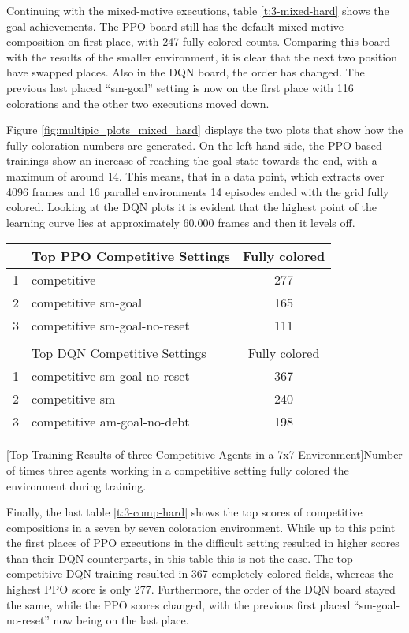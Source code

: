 Continuing with the mixed-motive executions, table \ref{t:3-mixed-hard} shows the goal achievements.
The PPO board still has the default mixed-motive composition on first place, with 247 fully colored counts. Comparing this board with the results of the smaller environment, it is clear that the next two position have swapped places. Also in the DQN board, the order has changed. The previous last placed ``sm-goal'' setting is now on the first place with 116 colorations and the other two executions moved down. 

Figure \ref{fig:multipic_plots_mixed_hard} displays the two plots that show how the fully coloration numbers are generated. On the left-hand side, the PPO based trainings show an increase of reaching the goal state towards the end, with a maximum of around 14. This means, that in a data point, which extracts over 4096 frames and 16 parallel environments 14 episodes ended with the grid fully colored. Looking at the DQN plots it is evident that the highest point of the learning curve lies at approximately 60.000 frames and then it levels off.

\begin{center}
\begin{tabular}{clc}\hline
      & Top PPO Competitive Settings & Fully colored \\ \hline
    {\small 1} & competitive & 277 \\
    {\small 2} & competitive sm-goal & 165 \\
    {\small 3} & competitive sm-goal-no-reset & 111 \\ \hline
      &   \\ \hline
      & Top DQN Competitive Settings & Fully colored \\ \hline
    {\small 1} & competitive sm-goal-no-reset & 367 \\
    {\small 2} & competitive sm & 240 \\
    {\small 3} & competitive am-goal-no-debt & 198 \\ \hline
    \end{tabular}
    [Top Training Results of three Competitive Agents in a 7x7 Environment]{Number of times three agents working in a competitive setting fully colored the environment during training.}\label{t:3-comp-hard}
\end{center}

Finally, the last table \ref{t:3-comp-hard} shows the top scores of competitive compositions in a seven by seven coloration environment. While up to this point the first places of PPO executions in the difficult setting resulted in higher scores than their DQN counterparts, in this table this is not the case. The top competitive DQN training resulted in 367 completely colored fields, whereas the highest PPO score is only 277. Furthermore, the order of the DQN board stayed the same, while the PPO scores changed, with the previous first placed ``sm-goal-no-reset'' now being on the last place. 

